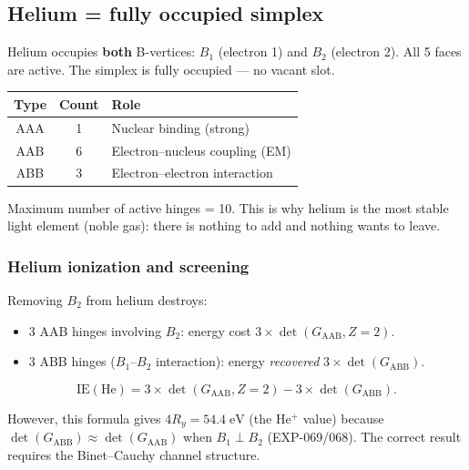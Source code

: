 \documentclass[12pt]{article}
\theoremstyle{remark}
\theoremstyle{definition}
\begin{document}
\subsection{Helium = fully occupied simplex}

Helium occupies \textbf{both} B-vertices: $B_1$ (electron 1) and $B_2$ (electron 2). All 5 faces are active. The simplex is fully occupied --- no vacant slot.

\begin{center}
\begin{tabular}{ccl}
\hline
Type & Count & Role \\
\hline
AAA & 1 & Nuclear binding (strong) \\
AAB & 6 & Electron--nucleus coupling (EM) \\
ABB & 3 & Electron--electron interaction \\
\hline
\end{tabular}
\end{center}

Maximum number of active hinges = 10. This is why helium is the most stable light element (noble gas): there is nothing to add and nothing wants to leave.

\subsubsection{Helium ionization and screening}

Removing $B_2$ from helium destroys:
\begin{itemize}
\item 3 AAB hinges involving $B_2$: energy cost $3 \times \det(G_{\text{AAB}}, Z\!=\!2)$.
\item 3 ABB hinges ($B_1$--$B_2$ interaction): energy \emph{recovered} $3 \times \det(G_{\text{ABB}})$.
\end{itemize}

\begin{equation}
\text{IE}(\text{He}) = 3 \times \det(G_{\text{AAB}}, Z\!=\!2) - 3 \times \det(G_{\text{ABB}}).
\end{equation}

However, this formula gives $4R_y = 54.4\;\text{eV}$ (the He$^+$ value) because $\det(G_\text{ABB}) \approx \det(G_\text{AAB})$ when $B_1 \perp B_2$ (EXP-069/068).  The correct result requires the Binet--Cauchy channel structure.
\end{document}
